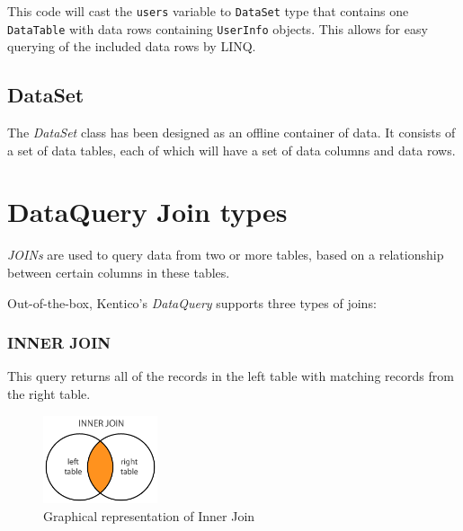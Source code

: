 \documentclass[
  print,
  table,
  nolof,
  nolot,
  nocover,
  oneside
]{fithesis3}
\begin{document}
This code will cast the \texttt{users} variable to \texttt{DataSet} type that contains one \texttt{DataTable} with data rows containing \texttt{UserInfo} objects. This allows for easy querying of the included data rows by LINQ.

\subsection{DataSet}
The \textit{DataSet} class has been designed as an offline container of data. It consists of a set of data tables, each of which will have a set of data columns and data rows\parencite{dataset}.


\section{DataQuery Join types}
\label{dataquery join types}

\textit{JOINs} are used to query data from two or more tables, based on a relationship between certain columns in these tables. 

Out-of-the-box, Kentico's \textit{DataQuery} supports three types of joins:

\subsubsection{INNER JOIN}
This query returns all of the records in the left table with matching records from the right table.
\begin{figure}[!ht]
  \centering
  \begin{minipage}{\textwidth}
    \begin{center}
      \includegraphics[width=0.3\textwidth]{img/sql-inner-join.png}
    \end{center}
  \end{minipage}
  \caption{Graphical representation of Inner Join}
  \label{inner_join}
\end{figure}
\end{document}
